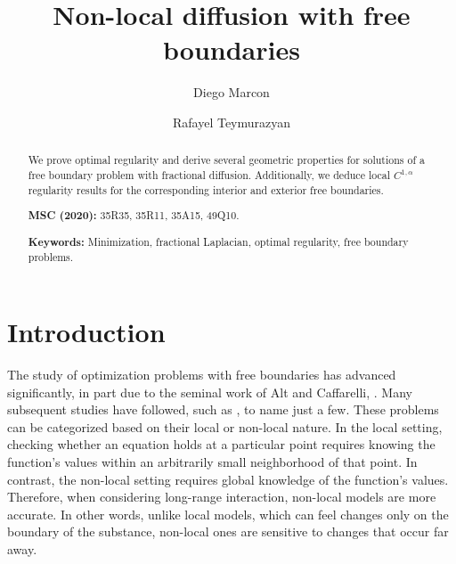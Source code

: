 \documentclass[11pt, reqno]{amsart}
\date{}
\numberwithin{equation}{section}
\numberwithin{theorem}{section}
\numberwithin{lemma}{section}
\numberwithin{corollary}{section}
\numberwithin{remark}{section}
\numberwithin{proposition}{section}
\numberwithin{definition}{section}
\begin{document}
\title[Non-local diffusion with free boundaries]{Non-local diffusion with free boundaries}

\author[D. Marcon]{Diego Marcon}
    \address{Departamento de Matem\'{a}tica Pura e Aplicada, Universidade Federal do Rio Grande do Sul, Porto Alegre - RS, Brazil.}

\author[R. Teymurazyan]{Rafayel Teymurazyan}
	\address{Applied Mathematics and Computational Sciences Program (AMCS), Computer, Electrical and Mathematical Sciences and Engineering Division (CEMSE), King Abdullah University of Science and Technology (KAUST), Thuwal, 23955-6900, Kingdom of Saudi Arabia}{}

\begin{abstract}
We prove optimal regularity and derive several geometric properties for solutions of a free boundary problem with fractional diffusion. Additionally, we deduce local $C^{1,\alpha}$ regularity results for the corresponding interior and exterior free boundaries.

\bigskip

\noindent \textbf{MSC (2020):} 35R35, 35R11, 35A15, 49Q10.

\bigskip

\noindent \textbf{Keywords:} Minimization, fractional Laplacian, optimal regularity, free boundary problems.
\end{abstract}

\maketitle

\section{Introduction}
The study of optimization problems with free boundaries has advanced significantly, in part due to the seminal work of Alt and Caffarelli, \cite{AC81}. Many subsequent studies have followed, such as \cite{BMW06, OT06, ST24, T05, T10, TT15, TU17, Y16}, to name just a few. These problems can be categorized based on their local or non-local nature. In the local setting, checking whether an equation holds at a particular point requires knowing the function's values within an arbitrarily small neighborhood of that point. In contrast, the non-local setting requires global knowledge of the function's values. Therefore, when considering long-range interaction, non-local models are more accurate. In other words, unlike local models, which can feel changes only on the boundary of the substance, non-local ones are sensitive to changes that occur far away.
\end{document}
